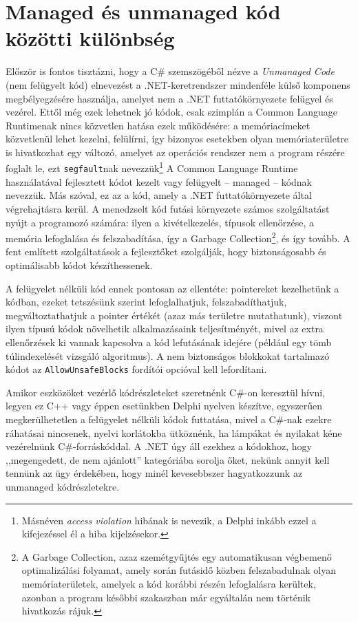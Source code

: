 \documentclass[tocnopagenum]{thesis-ekf}
\theoremstyle{definition}
\theoremstyle{remark}
\begin{document}
	\section{Managed és unmanaged kód közötti különbség}
	\label{managed_unmanaged}
	Először is fontos tisztázni, hogy a C\# szemszögéből nézve a \textit{Unmanaged Code} (nem felügyelt kód) elnevezést a .NET-keretrendszer mindenféle külső komponens megbélyegzésére használja, amelyet nem a .NET futtatókörnyezete felügyel és vezérel. Ettől még ezek lehetnek jó kódok, csak szimplán a Common Language Runtimenak nincs közvetlen hatása ezek működésére: a memóriacímeket közvetlenül lehet kezelni, felülírni, így bizonyos esetekben olyan memóriaterületre is hivatkozhat egy változó, amelyet az operációs rendszer nem a program részére foglalt le, ezt \verb*|segfault|nak nevezzük\footnote{Másnéven \textit{access violation} hibának is nevezik, a Delphi inkább ezzel a kifejezéssel él a hiba kijelzésekor.}
	\cite{managed} 
	A Common Language Runtime használatával fejlesztett kódot kezelt vagy felügyelt -- managed -- kódnak nevezzük. Más szóval, ez az a kód, amely a .NET futtatókörnyezete által végrehajtásra kerül. 
	A menedzselt kód futási környezete számos szolgáltatást nyújt a programozó számára: ilyen a kivételkezelés, típusok ellenőrzése, a memória lefoglalása és felszabadítása, így a Garbage Collection\footnote{A Garbage Collection, azaz szemétgyűjtés egy automatikusan végbemenő optimalizálási folyamat, amely során futásidő közben felszabadulnak olyan memóriaterületek, amelyek a kód korábbi részén lefoglalásra kerültek, azonban a program későbbi szakaszban már egyáltalán nem történik hivatkozás rájuk.}, és így tovább. A fent említett szolgáltatások a fejlesztőket szolgálják, hogy biztonságosabb és optimálisabb kódot készíthessenek.
	\cite{marshalling_serialization}

	A felügyelet nélküli kód ennek pontosan az ellentéte: pointereket kezelhetünk a kódban, ezeket tetszésünk szerint lefoglalhatjuk, felszabadíthatjuk, megváltoztathatjuk a pointer értékét (azaz más területre mutathatunk), viszont ilyen típusú kódok növelhetik alkalmazásaink teljesítményét, mivel az extra ellenőrzések ki vannak kapcsolva a kód lefutásának idejére (például egy tömb túlindexelését vizsgáló algoritmus).
	A nem biztonságos blokkokat tartalmazó kódot az \verb*|AllowUnsafeBlocks| fordítói opcióval kell lefordítani.
	
	Amikor eszközöket vezérlő kódrészleteket szeretnénk C\#-on keresztül hívni, legyen ez C++ vagy éppen esetünkben Delphi nyelven készítve, egyszerűen megkerülhetetlen a felügyelet nélküli kódok futtatása, mivel a C\#-nak ezekre ráhatásai nincsenek, nyelvi korlátokba ütköznénk, ha lámpákat és nyilakat kéne vezérelnünk C\#-forráskóddal. A .NET úgy áll ezekhez a kódokhoz, hogy ,,megengedett, de nem ajánlott'' kategóriába sorolja őket, nekünk annyit kell tennünk az ügy érdekében, hogy minél kevesebbszer hagyatkozzunk az unmanaged kódrészletekre.
	\cite{sof_managed}
\end{document}

